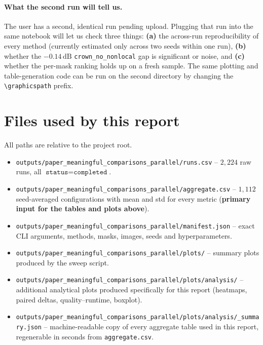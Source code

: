 \documentclass[11pt,a4paper]{article}
\newcommand{\method}[1]{\texttt{#1}}
\newcommand{\dB}{\,\textrm{dB}}
\begin{document}
\paragraph{What the second run will tell us.}
The user has a second, identical run pending upload. Plugging
that run into the same notebook will let us check three things:
\textbf{(a)} the across-run reproducibility of every method
(currently estimated only across two seeds within one run),
\textbf{(b)} whether the $-0.14\dB$ \method{crown\_no\_nonlocal}
gap is significant or noise, and
\textbf{(c)} whether the per-mask ranking holds up on a fresh
sample. The same plotting and table-generation code can be run on
the second directory by changing the \texttt{\textbackslash graphicspath}
prefix.

\appendix
\section{Files used by this report}\label{app:files}

All paths are relative to the project root.

\begin{itemize}[leftmargin=1.4em,itemsep=2pt,topsep=2pt]
\item \texttt{outputs/paper\_meaningful\_comparisons\_parallel/runs.csv}
-- $2{,}224$ raw runs, all $\texttt{status}=\texttt{completed}$.
\item \texttt{outputs/paper\_meaningful\_comparisons\_parallel/aggregate.csv}
-- $1{,}112$ seed-averaged configurations with mean and std for
every metric (\textbf{primary input for the tables and plots above}).
\item \texttt{outputs/paper\_meaningful\_comparisons\_parallel/manifest.json}
-- exact CLI arguments, methods, masks, images, seeds and
hyperparameters.
\item \texttt{outputs/paper\_meaningful\_comparisons\_parallel/plots/}
-- summary plots produced by the sweep script.
\item \texttt{outputs/paper\_meaningful\_comparisons\_parallel/plots/analysis/}
-- additional analytical plots produced specifically for this
report (heatmaps, paired deltas, quality--runtime, boxplot).
\item \texttt{outputs/paper\_meaningful\_comparisons\_parallel/plots/analysis/\_summary.json}
-- machine-readable copy of every aggregate table used in this
report, regenerable in seconds from \texttt{aggregate.csv}.
\end{itemize}
\end{document}
